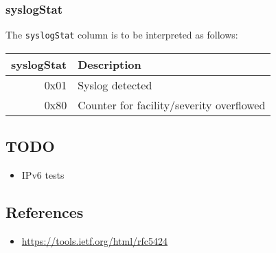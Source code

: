 \documentclass[documentation]{subfiles}
\begin{document}
\subsubsection{syslogStat}\label{syslogStat}
The {\tt syslogStat} column is to be interpreted as follows:
\begin{longtable}{rl}
    \toprule
    {\bf syslogStat} & {\bf Description}\\
    \midrule\endhead%
    0x01 & Syslog detected \\
    0x80 & Counter for facility/severity overflowed \\
    \bottomrule
\end{longtable}

\subsection{TODO}
\begin{itemize}
    \item IPv6 tests
\end{itemize}

\subsection{References}
\begin{itemize}
    \item \url{https://tools.ietf.org/html/rfc5424}
\end{itemize}
\end{document}
